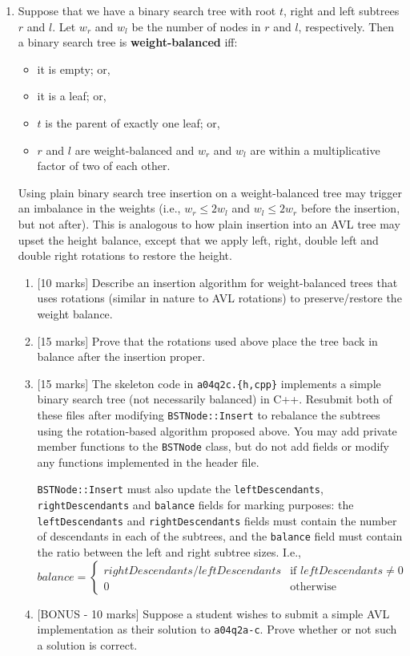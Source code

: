 \documentclass[11pt]{article}
\begin{document}
\begin{enumerate}
\item 
Suppose that we have a binary search tree with root $t$, right and left subtrees $r$ and $l$.
Let $w_r$ and $w_l$ be the number of nodes in $r$ and $l$, respectively.
Then a binary search tree is {\bf weight-balanced} iff: 
\begin{itemize}
\item it is empty; or, 
\item it is a leaf; or, 
\item $t$ is the parent of exactly one leaf; or, 
\item $r$ and $l$ are weight-balanced and $w_r$ and $w_l$ are within a multiplicative factor of two of each other.
\end{itemize}

Using plain binary search tree insertion on a weight-balanced tree may trigger an imbalance in the weights (i.e., $w_r \leq 2w_l$ and $w_l \leq 2w_r$ before the insertion, but not after).
This is analogous to how plain insertion into an AVL tree may upset the height balance, except that we apply left, right, double left and double right rotations to restore the height. 

\begin{enumerate}
\item {[10 marks]}
Describe an insertion algorithm for weight-balanced trees that uses rotations (similar in nature to AVL rotations) to preserve/restore the weight balance.

\item {[15 marks]} 
Prove that the rotations used above place the tree back in balance after the insertion proper.

\item {[15 marks]}  
The skeleton code in {\tt a04q2c.\{h,cpp\}} implements a simple binary search tree (not necessarily balanced) in C++.
Resubmit both of these files after modifying {\tt BSTNode::Insert} to rebalance the subtrees using the rotation-based algorithm proposed above.
You may add private member functions to the {\tt BSTNode} class, but do not add fields or modify any functions implemented in the header file.

{\tt BSTNode::Insert} must also update the {\tt leftDescendants}, {\tt rightDescendants} and {\tt balance} fields for marking purposes: the {\tt leftDescendants} and {\tt rightDescendants} fields must contain the number of descendants in each of the subtrees, and the {\tt balance} field must contain the ratio between the left and right subtree sizes.
I.e.,  
$$
balance=
\begin{cases}
rightDescendants/leftDescendants & \mbox{if } leftDescendants \neq 0 \\
0 & \mbox{otherwise}
\end{cases}
$$

\item {[BONUS - 10 marks]}
Suppose a student wishes to submit a simple AVL implementation as their solution to {\tt a04q2a-c}.
Prove whether or not such a solution is correct.
\end{enumerate}
\end{enumerate}
\end{document}
